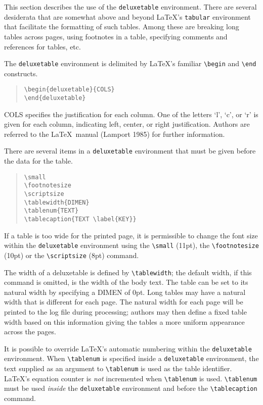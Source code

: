 This section describes the use of the {\tt deluxetable} environment.
There are several desiderata that are somewhat above and beyond LaTeX's
{\tt tabular} environment that facilitate the formatting of such tables.
Among these are breaking long tables across pages, using footnotes
in a table, specifying comments and references for tables, etc.

The {\tt deluxetable} environment is delimited by \LaTeX's familiar
\verb"\begin" and \verb"\end" constructs.
\begin{quote}
\verb"\begin{deluxetable}{COLS}"\\
\verb"\end{deluxetable}"
\end{quote}
{\small COLS} specifies the justification for each column.
One of the letters `l', `c', or `r' is given for each column,
indicating left, center, or right justification.  Authors are
referred to the \LaTeX\ manual (Lamport 1985) for further information.

There are several items in a {\tt deluxetable} environment that
must be given before the data for the table.

\begin{quote}
\verb"\small"\\
\verb"\footnotesize"\\
\verb"\scriptsize" \\
\verb"\tablewidth{DIMEN}"\\
\verb"\tablenum{TEXT}"\\
\verb"\tablecaption{TEXT \label{KEY}}"
\end{quote}

If a table is too wide for the printed page, it is permissible to change the 
font size within the {\tt deluxetable} environment using the \verb"\small" 
(11pt), the \verb"\footnotesize" (10pt) or the \verb"\scriptsize" (8pt) command.

The width of a deluxetable is defined by \verb"\tablewidth";
the default width, if this command is omitted, is the width of the body text.
The table can be set to its natural width by specifying
a {\small DIMEN} of 0pt.  Long tables may have a natural width that is 
different for each page.  The natural width for each page will be printed 
to the log file during processing;
authors may then define a fixed table width based 
on this information giving the 
tables a more uniform appearance across the pages.

It is possible to override \LaTeX's automatic numbering within the
{\tt deluxetable} environment.
When \verb"\tablenum" is specified inside a {\tt deluxetable} environment,
the text supplied as an argument to \verb"\tablenum" is used as the
table identifier.
\LaTeX's equation counter is {\sl not\/} incremented when \verb"\tablenum"
is used.
\verb"\tablenum" must be used {\sl inside\/} the {\tt deluxetable} environment
and before the \verb"\tablecaption" command.

